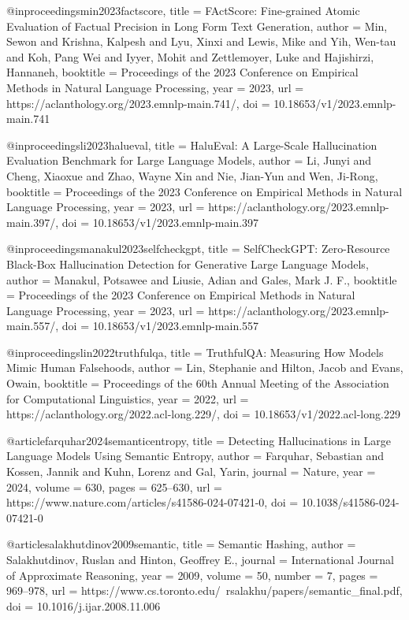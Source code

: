 @inproceedings{min2023factscore,
  title     = {{FActScore}: Fine-grained Atomic Evaluation of Factual Precision in Long Form Text Generation},
  author    = {Min, Sewon and Krishna, Kalpesh and Lyu, Xinxi and Lewis, Mike and Yih, Wen-tau and Koh, Pang Wei and Iyyer, Mohit and Zettlemoyer, Luke and Hajishirzi, Hannaneh},
  booktitle = {Proceedings of the 2023 Conference on Empirical Methods in Natural Language Processing},
  year      = {2023},
  url       = {https://aclanthology.org/2023.emnlp-main.741/},
  doi       = {10.18653/v1/2023.emnlp-main.741}
}

@inproceedings{li2023halueval,
  title     = {{HaluEval}: A Large-Scale Hallucination Evaluation Benchmark for Large Language Models},
  author    = {Li, Junyi and Cheng, Xiaoxue and Zhao, Wayne Xin and Nie, Jian-Yun and Wen, Ji-Rong},
  booktitle = {Proceedings of the 2023 Conference on Empirical Methods in Natural Language Processing},
  year      = {2023},
  url       = {https://aclanthology.org/2023.emnlp-main.397/},
  doi       = {10.18653/v1/2023.emnlp-main.397}
}

@inproceedings{manakul2023selfcheckgpt,
  title     = {{SelfCheckGPT}: Zero-Resource Black-Box Hallucination Detection for Generative Large Language Models},
  author    = {Manakul, Potsawee and Liusie, Adian and Gales, Mark J. F.},
  booktitle = {Proceedings of the 2023 Conference on Empirical Methods in Natural Language Processing},
  year      = {2023},
  url       = {https://aclanthology.org/2023.emnlp-main.557/},
  doi       = {10.18653/v1/2023.emnlp-main.557}
}

@inproceedings{lin2022truthfulqa,
  title     = {{TruthfulQA}: Measuring How Models Mimic Human Falsehoods},
  author    = {Lin, Stephanie and Hilton, Jacob and Evans, Owain},
  booktitle = {Proceedings of the 60th Annual Meeting of the Association for Computational Linguistics},
  year      = {2022},
  url       = {https://aclanthology.org/2022.acl-long.229/},
  doi       = {10.18653/v1/2022.acl-long.229}
}

@article{farquhar2024semanticentropy,
  title   = {Detecting Hallucinations in Large Language Models Using Semantic Entropy},
  author  = {Farquhar, Sebastian and Kossen, Jannik and Kuhn, Lorenz and Gal, Yarin},
  journal = {Nature},
  year    = {2024},
  volume  = {630},
  pages   = {625--630},
  url     = {https://www.nature.com/articles/s41586-024-07421-0},
  doi     = {10.1038/s41586-024-07421-0}
}

@article{salakhutdinov2009semantic,
  title   = {Semantic Hashing},
  author  = {Salakhutdinov, Ruslan and Hinton, Geoffrey E.},
  journal = {International Journal of Approximate Reasoning},
  year    = {2009},
  volume  = {50},
  number  = {7},
  pages   = {969--978},
  url     = {https://www.cs.toronto.edu/~rsalakhu/papers/semantic_final.pdf},
  doi     = {10.1016/j.ijar.2008.11.006}
}

